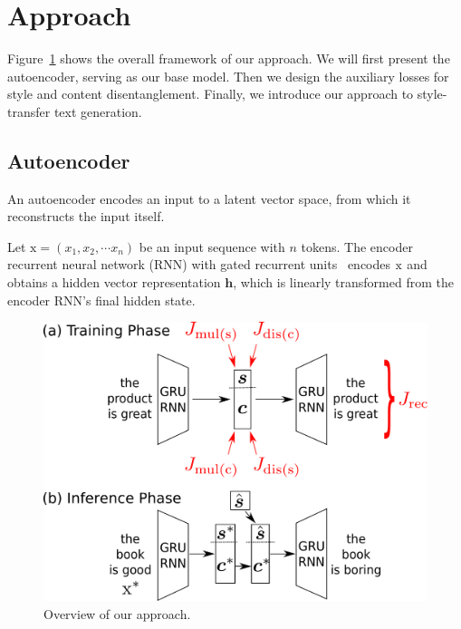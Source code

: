 \documentclass[11pt,a4paper]{article}
\newcommand{\rmx}{\mathrm x}
\begin{document}
\section{Approach}
Figure~\ref{fig:overview} shows the overall framework of our approach.
We will first present the autoencoder, serving as our base model.
Then we design the auxiliary losses for style and content disentanglement.
Finally, we introduce our approach to style-transfer text generation.


\subsection{Autoencoder} \label{ssec:seq2seq-autoencoder}

An autoencoder encodes an input to a latent vector space, from which it reconstructs the input itself.

Let $\rmx=(x_1, x_2, \cdots x_n)$ be an input sequence with $n$ tokens.
The encoder recurrent neural network (RNN) with gated recurrent units~\cite[GRUs,][]{cho2014learning} encodes $\rm x$ and obtains a hidden vector representation $\bm h$, which is linearly transformed from the encoder RNN's final hidden state.

\begin{figure}[!t]
	\centering
	\includegraphics[width=.9\linewidth]{model-overview}
	\caption{Overview of our approach.}
	\label{fig:overview}
\end{figure}
\end{document}
